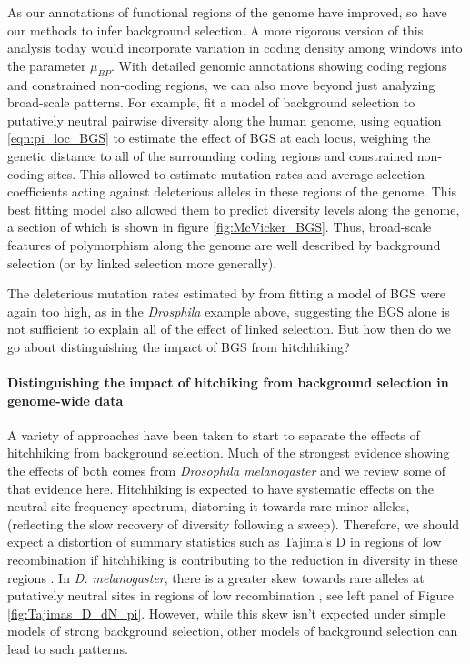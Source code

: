 As our annotations of functional regions of the genome have improved, so have our
methods to infer background selection. A more rigorous version of this analysis today would incorporate variation in coding density among windows into the parameter $\mu_{BP}$. With detailed genomic annotations showing
coding regions and constrained non-coding regions, we can also move
beyond just analyzing broad-scale patterns. For example,
\citet{Mcvicker:09} fit a model of background selection to putatively
neutral pairwise diversity along the human genome, using equation
\ref{eqn:pi_loc_BGS} to estimate the effect of BGS at each locus,
weighing the genetic distance to all of the surrounding coding
regions and constrained non-coding sites. This allowed
\citet{Mcvicker:09} to estimate mutation rates and average selection
coefficients acting against deleterious alleles in these regions of
the genome. This best fitting model also allowed them to predict
diversity levels along the genome, a section of which is shown in
figure \ref{fig:McVicker_BGS}. Thus, broad-scale features of
polymorphism along the genome are well described by background selection
(or by linked selection more generally).

The deleterious mutation rates estimated by \citet{Mcvicker:09} from
fitting a model of BGS were again too high, as in the {\it Drosphila}
example above, suggesting the BGS alone is not sufficient to
explain all of the effect of linked selection. But how then do we go about distinguishing the impact of BGS from hitchhiking? 

\paragraph{Distinguishing the impact of hitchiking from  background selection in
  genome-wide data}

A variety of approaches have been taken to start to separate the effects of hitchhiking from background
selection. Much of the
strongest evidence showing the effects of both comes from
\textit{Drosophila melanogaster} and we review some of that evidence here. 
Hitchhiking is expected to have systematic effects on the neutral site
frequency spectrum, distorting it towards rare minor alleles,
(reflecting the slow recovery of diversity following a
sweep). Therefore, we should expect a distortion of summary
statistics such as Tajima's D in regions of low recombination if
hitchhiking is contributing to the reduction in diversity in these
regions \citep{Braverman:95, Przeworski:02,Kim:06}. In \textit{D. melanogaster}, there is a greater skew towards rare
alleles at putatively neutral sites in regions of low recombination
\citep{Andolfatto:01,Shapiro:07}, see left panel of Figure
\ref{fig:Tajimas_D_dN_pi}. However, while this skew isn't expected under
simple models of strong background selection, other models of background selection
can lead to such patterns. 

